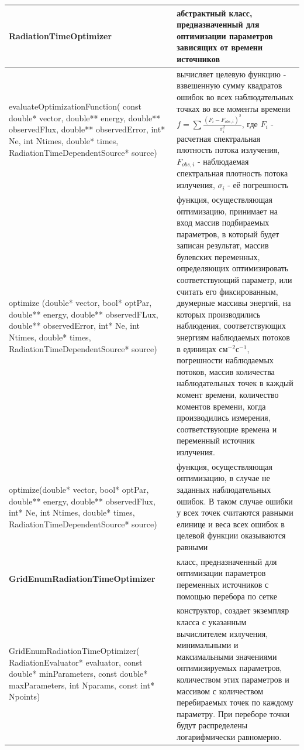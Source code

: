 \begin{small}
	\label{RadiationTimeOptimizerMethods}
	\begin{xtabular}{|p{0.5\textwidth}|p{0.5\textwidth}|}
		\hline
		\textbf{RadiationTimeOptimizer} & абстрактный класс, предназначенный для оптимизации параметров зависящих от времени источников\\
		\hline
		evaluateOptimizationFunction( const double* vector, double** energy, double** observedFlux, double** observedError, int* Ne, int Ntimes, double* times, RadiationTimeDependentSource* source) & вычисляет целевую функцию - взвешенную сумму квадратов ошибок во всех наблюдательных точках во все моменты времени $f = \sum \frac{(F_i - F_{obs,i})^2}{\sigma_i^2}$, где $F_i$ - расчетная спектральная плотность потока излучения, $F_{obs,i}$ - наблюдаемая спектральная плотность потока излучения, $\sigma_i$ - её погрешность\\
		\hline
		optimize (double* vector, bool* optPar, double** energy, double** observedFLux, double** observedError, int* Ne, int Ntimes, double* times, RadiationTimeDependentSource* source) & функция, осуществляющая оптимизацию, принимает на вход массив подбираемых параметров, в который будет записан результат, массив булевских переменных, определяющих оптимизировать соответствующий параметр, или считать его фиксированным, двумерные массивы энергий, на которых производились наблюдения, соответствующих энергиям наблюдаемых потоков в единицах $\text{см}^{-2}\text{с}^{-1}$, погрешности наблюдаемых потоков, массив количества наблюдательных точек в каждый момент времени, количество моментов времени, когда производились измерения, соответствующие времена и переменный источник излучения.\\
		\hline
		optimize(double* vector, bool* optPar, double** energy, double** observedFlux, int* Ne, int Ntimes, double* times, RadiationTimeDependentSource* source) & функция, осуществляющая оптимизацию, в случае не заданных наблюдательных ошибок. В таком случае ошибки у всех точек считаются равными елинице и веса всех ошибок в целевой функции оказываются равными\\
		\hline
		\textbf{GridEnumRadiationTimeOptimizer} & класс, предназначенный для оптимизации параметров переменных источников с помощью перебора по сетке\\
		\hline
		GridEnumRadiationTimeOptimizer( RadiationEvaluator* evaluator, const double* minParameters, const double* maxParameters, int Nparams, const int* Npoints) & конструктор, создает экземпляр класса с указанным вычислителем излучения, минимальными и максимальными значениями оптимизируемых параметров, количеством этих параметров и массивом с количеством перебираемых точек по каждому параметру. При переборе точки будут распределены логарифмически равномерно.\\

\end{xtabular}
\end{small}
